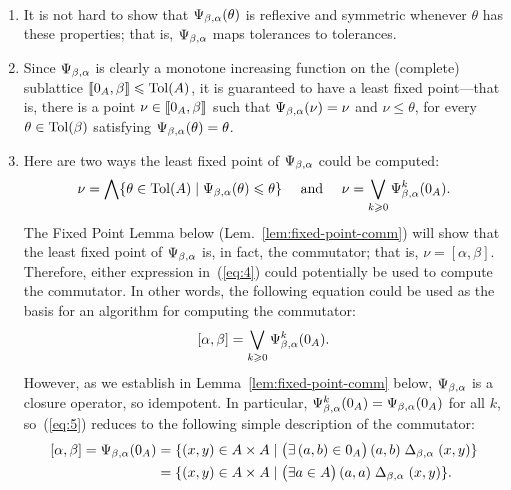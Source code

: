 \begin{remarks}\
  \begin{enumerate}
\item
  It is not hard to show that $\Psi_{\beta, \alpha} (\theta)$ is reflexive and symmetric
  whenever $\theta$ has these properties; that is, $\Psi_{\beta, \alpha}$ maps tolerances
  to tolerances.
  \item 
  Since $\Psi_{\beta, \alpha}$ is clearly a monotone increasing function on the (complete) sublattice
  $\llbracket 0_A, \beta\rrbracket \leqslant \operatorname{Tol}(A)$, it is guaranteed to have a least fixed
  point---that is, there is a point $\nu\in \llbracket 0_A, \beta\rrbracket$ such that $\Psi_{\beta, \alpha}(\nu) = \nu$
  and $\nu \leq \theta$, for every $\theta\in \operatorname{Tol}(\beta)$
  satisfying $\Psi_{\beta, \alpha}(\theta) = \theta$.
\item
  Here are two ways the least fixed point of $\Psi_{\beta, \alpha}$ could be computed:
  \begin{equation}
    \label{eq:4}
  \nu = \bigwedge \{ \theta \in \operatorname{Tol}(A) \mid \Psi_{\beta, \alpha}(\theta) \leqslant \theta\}
  \quad \text{ and } \quad
     \nu = \bigvee_{k\geqslant 0} \Psi_{\beta, \alpha}^{k}(0_A).
  \end{equation}
  The Fixed Point Lemma below (Lem.~\ref{lem:fixed-point-comm})
  will show that the least
  fixed point of $\Psi_{\beta, \alpha}$ is, in fact, the commutator;
  that is, $\nu = [\alpha, \beta]$.  Therefore, either
  expression in~(\ref{eq:4}) could potentially be used to compute the
  commutator.
  In other words, the following equation could be used as the basis for an
  algorithm for computing the commutator:
  \begin{equation}
    \label{eq:5}
          [\alpha, \beta] = \bigvee_{k\geqslant 0} \Psi_{\beta, \alpha}^{k}(0_A).
  \end{equation}
  However, as we establish in Lemma~\ref{lem:fixed-point-comm} below,
  $\Psi_{\beta, \alpha}$ is a closure operator, so idempotent. In particular,
  $\Psi_{\beta, \alpha}^{k}(0_A) = \Psi_{\beta, \alpha}(0_A)$ for all $k$, so~(\ref{eq:5}) reduces
  to the following simple description of the commutator:
  \begin{align*}
          [\alpha, \beta] =
          \Psi_{\beta, \alpha}(0_A)
          &= \{ (x,y) \in A\times A \mid
          \bigl(\exists\, (a,b) \in 0_A\big)\, (a,b) \mathrel{\Delta_{\beta, \alpha}} (x,y)\}\\
          &= \{ (x,y) \in A\times A \mid
          \bigl(\exists a \in A\bigr)\, (a,a) \mathrel{\Delta_{\beta, \alpha}} (x,y)\}.
  \end{align*}


  \end{enumerate}
\end{remarks}



